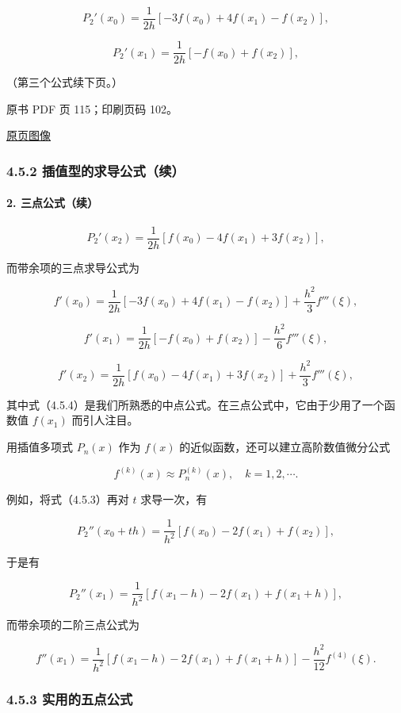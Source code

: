 \[
P_2'(x_0)=\frac1{2h}[-3f(x_0)+4f(x_1)-f(x_2)],
\]

\[
P_2'(x_1)=\frac1{2h}[-f(x_0)+f(x_2)],
\]

（第三个公式续下页。）

\clearpage

原书 PDF 页 115；印刷页码 102。

\href{source-images/pdf-115.jpeg}{原页图像}

\subsubsection{4.5.2 插值型的求导公式（续）}\label{ch04b-ux63d2ux503cux578bux7684ux6c42ux5bfcux516cux5f0fux7eed-1}

\paragraph{2. 三点公式（续）}\label{ch04b-ux4e09ux70b9ux516cux5f0fux7eed}

\[
P_2'(x_2)=\frac1{2h}[f(x_0)-4f(x_1)+3f(x_2)],
\]

而带余项的三点求导公式为

\[
f'(x_0)=\frac1{2h}[-3f(x_0)+4f(x_1)-f(x_2)]+\frac{h^2}3f'''(\xi),
\]

\[
f'(x_1)=\frac1{2h}[-f(x_0)+f(x_2)]-\frac{h^2}6f'''(\xi),
\tag{4.5.4}
\]

\[
f'(x_2)=\frac1{2h}[f(x_0)-4f(x_1)+3f(x_2)]+\frac{h^2}3f'''(\xi),
\]

其中式（4.5.4）是我们所熟悉的中点公式。在三点公式中，它由于少用了一个函数值 \(f(x_1)\) 而引人注目。

用插值多项式 \(P_n(x)\) 作为 \(f(x)\) 的近似函数，还可以建立高阶数值微分公式

\[
f^{(k)}(x)\approx P_n^{(k)}(x),\quad k=1,2,\cdots.
\]

例如，将式（4.5.3）再对 \(t\) 求导一次，有

\[
P_2''(x_0+th)=\frac1{h^2}[f(x_0)-2f(x_1)+f(x_2)],
\]

于是有

\[
P_2''(x_1)=\frac1{h^2}[f(x_1-h)-2f(x_1)+f(x_1+h)],
\]

而带余项的二阶三点公式为

\[
f''(x_1)=\frac1{h^2}[f(x_1-h)-2f(x_1)+f(x_1+h)]-\frac{h^2}{12}f^{(4)}(\xi).
\tag{4.5.5}
\]

\subsubsection{4.5.3 实用的五点公式}\label{ch04b-ux5b9eux7528ux7684ux4e94ux70b9ux516cux5f0f}

